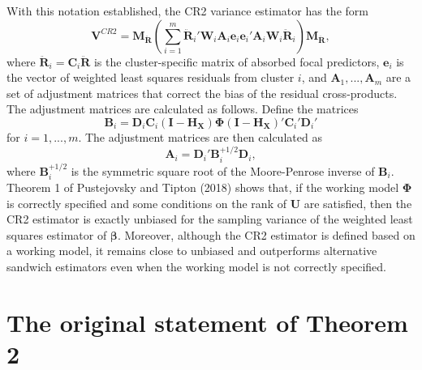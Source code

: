 \documentclass[12pt]{article}
\begin{document}
With this notation established, the CR2 variance estimator has the form
\begin{equation}
\mathbf{V}^{CR2} = \mathbf{M}_{\mathbf{\ddot{R}}} \left(\sum_{i=1}^m \mathbf{\ddot{R}}_i' \mathbf{W}_i \mathbf{A}_i \mathbf{e}_i \mathbf{e}_i' \mathbf{A}_i \mathbf{W}_i \mathbf{\ddot{R}}_i \right) \mathbf{M}_{\mathbf{\ddot{R}}},
\end{equation} where
\(\mathbf{\ddot{R}}_i = \mathbf{C}_i \mathbf{\ddot{R}}\) is the
cluster-specific matrix of absorbed focal predictors, \(\mathbf{e}_i\)
is the vector of weighted least squares residuals from cluster \(i\),
and \(\mathbf{A}_1,...,\mathbf{A}_m\) are a set of adjustment matrices
that correct the bias of the residual cross-products. The adjustment
matrices are calculated as follows. Define the matrices \begin{equation}
\label{eq:B-matrix}
\mathbf{B}_i = \mathbf{D}_i \mathbf{C}_i \left(\mathbf{I} - \mathbf{H}_{\mathbf{X}}\right) \boldsymbol\Phi \left(\mathbf{I} - \mathbf{H}_{\mathbf{X}}\right)'\mathbf{C}_i' \mathbf{D}_i'
\end{equation} for \(i = 1,...,m\). The adjustment matrices are then
calculated as \begin{equation}
\label{eq:A-matrix}
\mathbf{A}_i = \mathbf{D}_i' \mathbf{B}_i^{+1/2} \mathbf{D}_i,
\end{equation} where \(\mathbf{B}_i^{+1/2}\) is the symmetric square
root of the Moore-Penrose inverse of \(\mathbf{B}_i\). Theorem 1 of
Pustejovsky and Tipton (2018) shows that, if the working model
\(\boldsymbol\Phi\) is correctly specified and some conditions on the
rank of \(\mathbf{U}\) are satisfied, then the CR2 estimator is exactly
unbiased for the sampling variance of the weighted least squares
estimator of \(\boldsymbol\beta\). Moreover, although the CR2 estimator
is defined based on a working model, it remains close to unbiased and
outperforms alternative sandwich estimators even when the working model
is not correctly specified.

\hypertarget{the-original-statement-of-theorem-2}{%
\section{The original statement of Theorem
2}\label{the-original-statement-of-theorem-2}}
\end{document}
